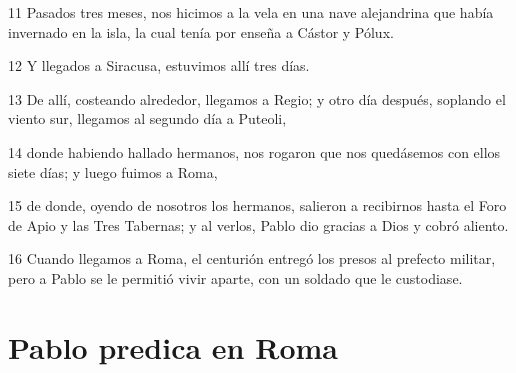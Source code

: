 \par 11 Pasados tres meses, nos hicimos a la vela en una nave alejandrina que había invernado en la isla, la cual tenía por enseña a Cástor y Pólux.
\par 12 Y llegados a Siracusa, estuvimos allí tres días.
\par 13 De allí, costeando alrededor, llegamos a Regio; y otro día después, soplando el viento sur, llegamos al segundo día a Puteoli,
\par 14 donde habiendo hallado hermanos, nos rogaron que nos quedásemos con ellos siete días; y luego fuimos a Roma,
\par 15 de donde, oyendo de nosotros los hermanos, salieron a recibirnos hasta el Foro de Apio y las Tres Tabernas; y al verlos, Pablo dio gracias a Dios y cobró aliento.
\par 16 Cuando llegamos a Roma, el centurión entregó los presos al prefecto militar, pero a Pablo se le permitió vivir aparte, con un soldado que le custodiase.

\section*{Pablo predica en Roma}

